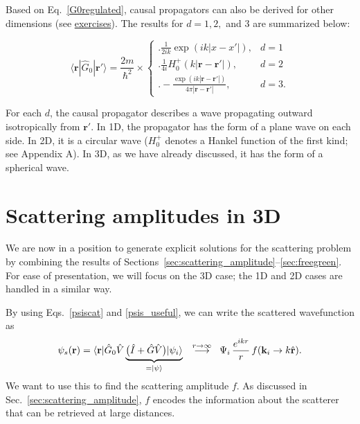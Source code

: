 \documentclass[pra,12pt]{revtex4-2}
\begin{document}
Based on Eq.~\eqref{G0regulated}, causal propagators can also be
derived for other dimensions (see
\hyperref[ex:1dpropagator]{exercises}).  The results for $d = 1, 2,$
and $3$ are summarized below:
\begin{framed}
  \begin{equation}
    \langle\mathbf{r}|\hat{G}_0|\mathbf{r}'\rangle = \frac{2m}{\hbar^2} \times \begin{cases} \Bigg.\displaystyle\frac{1}{2ik} \exp\left(ik|x-x'|\right),& d=1\\ \Bigg. \displaystyle\frac{1}{4i} H^+_0(k|\mathbf{r}-\mathbf{r'}|), & d=2 \\ \displaystyle \Bigg. - \frac{\exp\left(ik|\mathbf{r}-\mathbf{r}'|\right)}{4\pi|\mathbf{r}-\mathbf{r}'|}, & d = 3.  \end{cases}
    \label{propagator_solutions}
  \end{equation}
\end{framed}
\vskip -0.1in
\noindent
For each $d$, the causal propagator describes a wave propagating
outward isotropically from $\mathbf{r}'$.  In 1D, the propagator has
the form of a plane wave on each side. In 2D, it is a circular wave
($H_0^+$ denotes a Hankel function of the first kind; see Appendix A).
In 3D, as we have already discussed, it has the form of a spherical
wave.



\section{Scattering amplitudes in 3D}
\label{sec:3damp}

We are now in a position to generate explicit solutions for the
scattering problem by combining the results of
Sections~\ref{sec:scattering_amplitude}--\ref{sec:freegreen}.  For
ease of presentation, we will focus on the 3D case; the 1D and 2D
cases are handled in a similar way.

By using Eqs.~\eqref{psiscat} and \eqref{psis_useful},
we can write the scattered wavefunction as
\begin{equation}
  \psi_s(\mathbf{r})
  = \langle\mathbf{r}|
  \hat{G}_0 \hat{V}
  \underbrace{\big(\hat{I} + \hat{G} \hat{V}\big) |\psi_i\rangle}_{= |\psi\rangle}
   \\
  \;\; \overset{r\rightarrow\infty}{\longrightarrow}\;\;
  \Psi_i \, \frac{e^{ikr}}{r} \, f(\mathbf{k}_i\rightarrow k\hat{\mathbf{r}}).
  \label{psis_expansion}
\end{equation}
We want to use this to find the scattering amplitude $f$.  As
discussed in Sec.~\ref{sec:scattering_amplitude}, $f$ encodes the
information about the scatterer that can be retrieved at large
distances.
\end{document}
